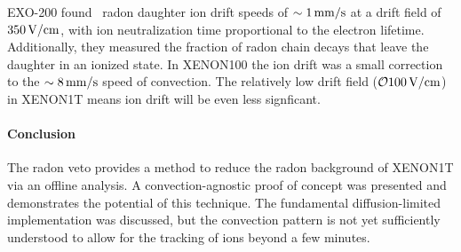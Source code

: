 EXO-200 found~\cite{Albert:2015vma} radon daughter ion drift speeds of $\sim 1\,\mathrm{mm/s}$ at a drift field of $350\,\mathrm{V/cm}$, with ion neutralization time proportional to the electron lifetime. Additionally, they measured the fraction of radon chain decays that leave the daughter in an ionized state. In XENON100 the ion drift was a small correction to the $\sim 8\,\mathrm{mm/s}$ speed of convection. The relatively low drift field ($\mathcal{O}{100}\,\mathrm{V/cm}$) in XENON1T means ion drift will be even less signficant.

\paragraph{Conclusion}

The radon veto provides a method to reduce the radon background of XENON1T via an offline analysis. A convection-agnostic proof of concept was presented and demonstrates the potential of this technique. The fundamental diffusion-limited implementation was discussed, but the convection pattern is not yet sufficiently understood to allow for the tracking of ions beyond a few minutes.